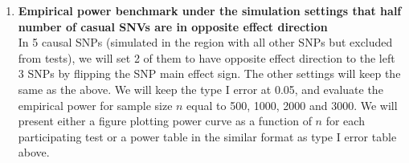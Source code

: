 \documentclass[12pt]{article}
\begin{document}
\begin{enumerate}
\item \textbf{Empirical power benchmark under the simulation settings that half number of casual SNVs are in opposite effect direction}\\
In 5 causal SNPs (simulated in the region with all other SNPs but excluded from tests), we will set 2 of them to have opposite effect direction to the left 3 SNPs by flipping the SNP main effect sign. The other settings will keep the same as the above. We will keep the type I error at 0.05, and evaluate the empirical power for sample size $n$ equal to 500, 1000, 2000 and 3000. We will present either a figure plotting power curve as a function of $n$ for each participating test or a power table in the similar format as type I error table above.

%


\end{enumerate}
\end{document}

